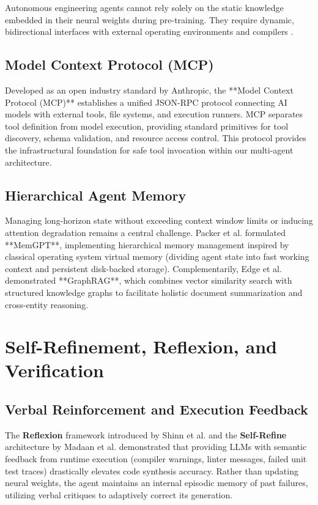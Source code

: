 Autonomous engineering agents cannot rely solely on the static knowledge embedded in their neural weights during pre-training. They require dynamic, bidirectional interfaces with external operating environments and compilers \cite{Schick2023Toolformer}.

\subsection{Model Context Protocol (MCP)}
Developed as an open industry standard by Anthropic, the **Model Context Protocol (MCP)** \cite{AnthropicMCP2024} establishes a unified JSON-RPC protocol connecting AI models with external tools, file systems, and execution runners. MCP separates tool definition from model execution, providing standard primitives for tool discovery, schema validation, and resource access control. This protocol provides the infrastructural foundation for safe tool invocation within our multi-agent architecture.

\subsection{Hierarchical Agent Memory}
Managing long-horizon state without exceeding context window limits or inducing attention degradation remains a central challenge. Packer et al. \cite{Packer2024MemGPT} formulated **MemGPT**, implementing hierarchical memory management inspired by classical operating system virtual memory (dividing agent state into fast working context and persistent disk-backed storage). Complementarily, Edge et al. \cite{Edge2024GraphRAG} demonstrated **GraphRAG**, which combines vector similarity search with structured knowledge graphs to facilitate holistic document summarization and cross-entity reasoning.

\section{Self-Refinement, Reflexion, and Verification}
\label{sec:self_refinement}

\subsection{Verbal Reinforcement and Execution Feedback}
The \textbf{Reflexion} framework introduced by Shinn et al. \cite{Shinn2023Reflexion} and the \textbf{Self-Refine} architecture by Madaan et al. \cite{Madaan2023SelfRefine} demonstrated that providing LLMs with semantic feedback from runtime execution (compiler warnings, linter messages, failed unit test traces) drastically elevates code synthesis accuracy. Rather than updating neural weights, the agent maintains an internal episodic memory of past failures, utilizing verbal critiques to adaptively correct its generation.

